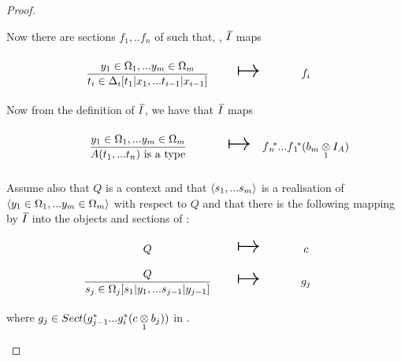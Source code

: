 \begin{proof}
\begin{newtt}
Now there are sections  $f_1,..f_n$  of \catcw such that, \foreachi, $\Ibar$ maps
\begin{equation}
\label{timapping}
\begin{array}{c c c}
\forceSOURCEwidth & & \forceTARGETwidth \\ [-0.1cm]
\tirule    & \Imapsto & f_i \\ [0.4cm]
\end{array}
\end{equation} 
Now from the definition of $\Ibar$, we have that $\Ibar$ maps
\begin{equation*}
\begin{array}{c c c}
\forceSOURCEwidth & & \forceTARGETwidth \\ [-0.1cm]
\gatdisplayrule{\yOmega{m}}{\isT{A(\tn)}}   & \Imapsto & \fnvectorstar(\crossx{b_m}{I_A}{1})\\ [0.4cm]
\end{array}
\end{equation*} 

Assume also  that $Q$ is a context and that $\tuple{\sm}$ is a realisation of $\tuple{\yOmega{m}}$ with respect to $Q$
and that there is the following mapping by $\Ibar$ into the objects and sections of \catc:
\begin{equation}
\label{sjmapping}
\begin{array}{c c c}
\forceSOURCEwidth & & \forceTARGETwidth \\ [-0.1cm]
Q          & \Imapsto & c   \\ [0.4cm]
\sjrule    & \Imapsto & g_j \\ [0.4cm]
\end{array}
\end{equation}
where $g_j \in Sect(g_{j-1}^*...g_i^*(\crossx{c}{b_j}{1}))$ in \catc.


\end{newtt}
\end{proof}
